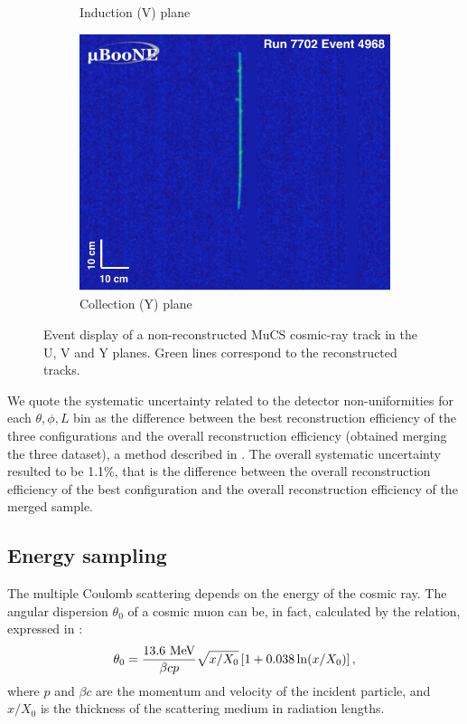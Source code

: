 \documentclass[a4paper]{scrartcl}
\begin{document}
\begin{figure}[htbp]
\begin{center}
\begin{subfigure}{0.3\textwidth}
      \caption{Induction (V) plane} \label{fig:v}
    \end{subfigure}
    \begin{subfigure}{0.3\textwidth}
      \includegraphics[width=\linewidth]{figures/y.png}
      \caption{Collection (Y) plane} \label{fig:y}
    \end{subfigure}    \caption{Event display of a non-reconstructed MuCS cosmic-ray track in the U, V and Y planes. Green lines correspond to the reconstructed tracks.} \label{fig:example}
  \end{center}
\end{figure}

We quote the systematic uncertainty related to the detector non-uniformities for each $\theta,\phi,L$ bin as the difference between the best reconstruction efficiency of the three configurations and the overall reconstruction efficiency (obtained merging the three dataset), a method described in \cite{besiii}. The overall systematic uncertainty resulted to be 1.1\%, that is the difference between the overall reconstruction efficiency of the best configuration and the overall reconstruction efficiency of the merged sample.

\subsection{Energy sampling}
The multiple Coulomb scattering depends on the energy of the cosmic ray. The angular dispersion $\theta_{0}$ of a cosmic muon can be, in fact, calculated by the relation, expressed in \cite{pdg}:
\begin{equation}
\theta_{0} = \frac{13.6~\mathrm{MeV}}{\beta c p}\sqrt{x/X_{0}}\left[1+0.038\thinspace\mathrm{ln}(x/X_0)\right],
\end{equation}
where $p$ and $\beta c$ are the momentum and velocity of the incident particle, and $x/X_0$ is the thickness of the scattering medium in radiation lengths.
\end{document}
